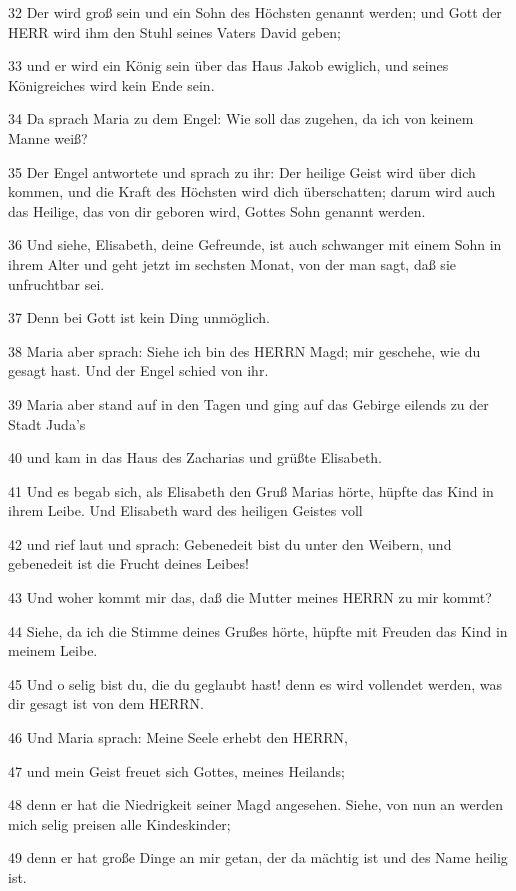 \par 32 Der wird groß sein und ein Sohn des Höchsten genannt werden; und Gott der HERR wird ihm den Stuhl seines Vaters David geben;
\par 33 und er wird ein König sein über das Haus Jakob ewiglich, und seines Königreiches wird kein Ende sein.
\par 34 Da sprach Maria zu dem Engel: Wie soll das zugehen, da ich von keinem Manne weiß?
\par 35 Der Engel antwortete und sprach zu ihr: Der heilige Geist wird über dich kommen, und die Kraft des Höchsten wird dich überschatten; darum wird auch das Heilige, das von dir geboren wird, Gottes Sohn genannt werden.
\par 36 Und siehe, Elisabeth, deine Gefreunde, ist auch schwanger mit einem Sohn in ihrem Alter und geht jetzt im sechsten Monat, von der man sagt, daß sie unfruchtbar sei.
\par 37 Denn bei Gott ist kein Ding unmöglich.
\par 38 Maria aber sprach: Siehe ich bin des HERRN Magd; mir geschehe, wie du gesagt hast. Und der Engel schied von ihr.
\par 39 Maria aber stand auf in den Tagen und ging auf das Gebirge eilends zu der Stadt Juda's
\par 40 und kam in das Haus des Zacharias und grüßte Elisabeth.
\par 41 Und es begab sich, als Elisabeth den Gruß Marias hörte, hüpfte das Kind in ihrem Leibe. Und Elisabeth ward des heiligen Geistes voll
\par 42 und rief laut und sprach: Gebenedeit bist du unter den Weibern, und gebenedeit ist die Frucht deines Leibes!
\par 43 Und woher kommt mir das, daß die Mutter meines HERRN zu mir kommt?
\par 44 Siehe, da ich die Stimme deines Grußes hörte, hüpfte mit Freuden das Kind in meinem Leibe.
\par 45 Und o selig bist du, die du geglaubt hast! denn es wird vollendet werden, was dir gesagt ist von dem HERRN.
\par 46 Und Maria sprach: Meine Seele erhebt den HERRN,
\par 47 und mein Geist freuet sich Gottes, meines Heilands;
\par 48 denn er hat die Niedrigkeit seiner Magd angesehen. Siehe, von nun an werden mich selig preisen alle Kindeskinder;
\par 49 denn er hat große Dinge an mir getan, der da mächtig ist und des Name heilig ist.
